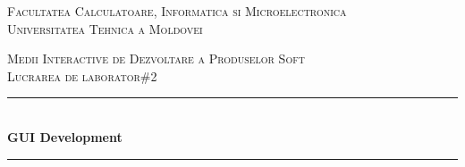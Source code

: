 \begin{center} %
	
	
	
	
	
	
	\textsc{\large Facultatea Calculatoare, Informatica si Microelectronica}\\[0.5cm]
	
	\textsc{\large Universitatea Tehnica a Moldovei}\\[1.2cm] %
	
	\vspace{25 mm}
	
	
	
	\textsc{\Large Medii Interactive de Dezvoltare a Produselor Soft}\\[0.5cm] %
	
	\textsc{\large Lucrarea de laborator\#2}\\[0.5cm] %
	
	
	
	
	\newcommand{\HRule}{\rule{\linewidth}{0.5mm}} %
	
	
	
	
	
	
	\vspace{10 mm}
	
	\HRule \\[0.4cm]
	
	{ \LARGE \bfseries GUI Development  }\\[0.4cm] %
	
	\HRule \\[1.5cm]
	
	
	
	

\end{center}
